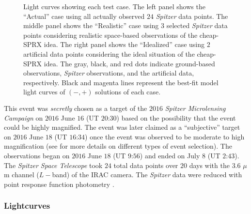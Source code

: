 \documentclass[10pt]{emulateapj}
\begin{document}
\begin{figure*}[htb!]
\caption{
Light curves showing each test case. The left panel shows the ``Actual'' case using all actually 
observed $24$ {\it Spitzer} data points. The middle panel shows the ``Realistic'' case using $3$ 
selected {\it Spitzer} data points considering realistic space-based observations of the 
cheap-SPRX idea. The right panel shows the ``Idealized'' case using $2$ artificial data points 
considering the ideal situation of the cheap-SPRX idea. The gray, black, and red dots indicate 
ground-based observations, {\it Spitzer} observations, and the artificial data, respectively. 
Black and magenta lines represent the best-fit model light curves of $(-,+)$ solutions of each case.
\label{fig:two}}
\end{figure*}

 This event was {\it secretly} chosen as a target of the $2016$ {\it Spitzer Microlensing Campaign} 
on $2016$ June $16$ (UT $20$:$30$) based on the possibility that the event could be highly magnified. 
The event was later claimed as a ``subjective'' target on $2016$ June $18$ (UT $16$:$34$) once 
the event was observed to be moderate to high magnification (see \citealt{yee15b} for more details 
on different types of event selection). The observations began on $2016$ June $18$ (UT $9$:$56$) and 
ended on July $8$ (UT $2$:$43$). The {\it Spitzer Space Telescope} took $24$ total data points over 
$20$ days with the $3.6$ $\mu$m channel ($L-$band) of the IRAC camera. The {\it Spitzer} data were 
reduced with point response function photometry \citep{calchi15b}.

\subsubsection{Lightcurves}
\end{document}
